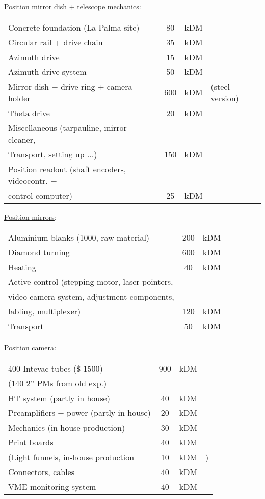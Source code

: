 \vspace{1.5cm}
\noindent
\underline{Position mirror dish + telescope mechanics}:\\ 
\begin{tabular}{lccl}
Concrete foundation (La Palma site) & 80  & kDM   \\ 
Circular rail + drive chain & 35  & kDM  \\ 
Azimuth drive & 15  & kDM  \\ 
Azimuth drive system & 50  & kDM  \\ 
Mirror dish + drive ring + camera holder & 600  & kDM & (steel version) \\ 
Theta drive & 20  & kDM  \\ 
Miscellaneous (tarpauline, mirror cleaner,  \\ 
Transport, setting up ...) & 150  & kDM  \\ 
Position readout (shaft encoders, videocontr. +  \\ 
control computer) & 25  & kDM 
\end{tabular}

\vspace{1.5cm}
\noindent
\underline{Position mirrors}:\\
\smallskip 
\begin{tabular}{lccl}
Aluminium blanks (1000, raw material) & 200  & kDM & \\ 
Diamond turning & 600  & kDM & \\ 
Heating & 40  & kDM & \\ 
Active control (stepping motor, laser pointers, &  & &\\ 
video camera system, adjustment components, &  \\ 
labling, multiplexer) & 120  & kDM & \\ 
Transport & 50  & kDM &
\end{tabular}


\vspace{1.5cm}
\noindent
\underline{Position camera}:\\
\smallskip 
\begin{tabular}{lccl}
400 Intevac tubes (\$ 1500) & 900  & kDM & \\ 
(140 2'' PMs from old exp.) &  & &\\ 
HT system (partly in house) & 40  & kDM & \\ 
Preamplifiers + power (partly in-house) & 20  & kDM & \\ 
Mechanics (in-house production) & 30  & kDM & \\ 
Print boards & 40  & kDM & \\ 
(Light funnels, in-house production & 10  & kDM &) \\ 
Connectors, cables & 40  & kDM & \\ 
VME-monitoring system & 40  & kDM &
\end{tabular}

